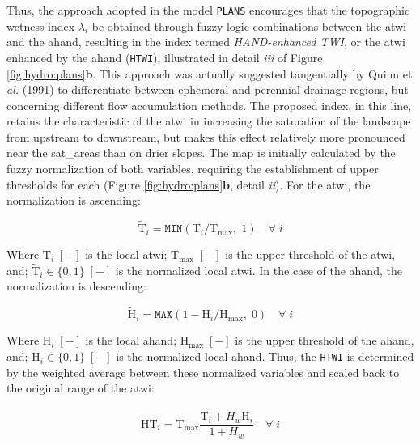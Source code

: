 \documentclass[./main_en.tex]{subfiles}
\begin{document}
\par Thus, the approach adopted in the \gls{model} \texttt{PLANS} encourages that the topographic wetness index $\lambda_i$ be obtained through fuzzy logic combinations between the \acrshort{atwi} and the \acrshort{ahand}, resulting in the index termed \textit{HAND-enhanced TWI}, or the \acrshort{atwi} enhanced by the \acrshort{ahand} (\texttt{HTWI}), illustrated in detail \textit{iii} of Figure \ref{fig:hydro:plans}\textbf{b}. This approach was actually suggested tangentially by Quinn et \textit{al.} (1991) \cite{Quinn1991b} to differentiate between ephemeral and perennial drainage regions, but concerning different flow accumulation methods. The proposed index, in this line, retains the characteristic of the \acrshort{atwi} in increasing the saturation of the landscape from upstream to downstream, but makes this effect relatively more pronounced near the \gls{sat_areas} than on drier slopes. The map is initially calculated by the fuzzy normalization of both variables, requiring the establishment of upper thresholds for each (Figure \ref{fig:hydro:plans}\textbf{b}, detail \textit{ii}). For the \acrshort{atwi}, the normalization is ascending:
\begin{linenomath*}
\begin{equation}
\label{eq:plans:ftwi}
\tilde{\text{T}}_i = \texttt{MIN}(\text{T}_i/\text{T}_\text{max},\; 1) \quad \forall \; i
\end{equation}
\end{linenomath*}
Where  $\text{T}_i\;[-]$ is the local \acrshort{atwi}; $\text{T}_\text{max}\;[-]$ is the upper threshold of the \acrshort{atwi}, and; $\tilde{\text{T}}_i\in \{0,1\}\;[-]$ is the normalized local \acrshort{atwi}. In the case of the \acrshort{ahand}, the normalization is descending:
\begin{linenomath*}
\begin{equation}
\label{eq:plans:ahand}
\tilde{\text{H}}_i = \texttt{MAX}(1 - \text{H}_i/\text{H}_\text{max},\; 0) \quad \forall \; i
\end{equation}
\end{linenomath*}
Where  $\text{H}_i\;[-]$ is the local \acrshort{ahand}; $\text{H}_\text{max}\;[-]$ is the upper threshold of the \acrshort{ahand}, and; $\tilde{\text{H}}_i\in \{0,1\}\;[-]$ is the normalized local \acrshort{ahand}. Thus, the \texttt{HTWI} is determined by the weighted average between these normalized variables and scaled back to the original range of the \acrshort{atwi}:
\begin{linenomath*}
\begin{equation}
\label{eq:plans:htwi}
\text{HT}_{i} = \text{T}_\text{max} \frac{\tilde{\text{T}}_i + H_w \tilde{\text{H}}_i}{1 + H_w} \quad \forall \; i
\end{equation}
\end{linenomath*}
\end{document}

